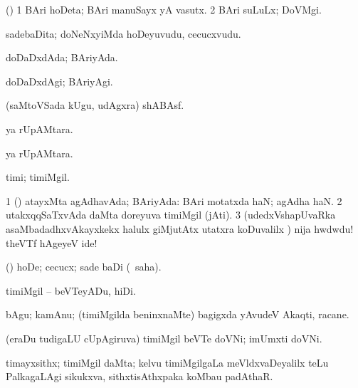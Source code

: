 {{{{{{\bentry
{} 
\gl{\nA}
\expl{}
\bmng
(\ashi) 
\bnum
\num{1} BAri hoDeta; BAri manuSayx yA vasutx. 
\num{2} BAri suLuLx; DoVMgi. 
\enum
\emng
\eentry

\bentry
{} 
\gl{\nA}
\expl{}
\bmng
sadebaDita; doNeNxyiMda hoDeyuvudu, cecucxvudu. 
\emng
\eentry

\bentry
{} 
\gl{\gu}
\expl{}
\bmng
doDaDxdAda; BAriyAda. 
\emng
\eentry

\bentry
{} 
\gl{\kirxvi}
\expl{}
\bmng
doDaDxdAgi; BAriyAgi. 
\emng
\eentry

\bentry
{} 
\gl{\BAavayx}
\expl{}
\bmng
(saMtoVSada kUgu, udAgxra) shABAsf. 
\emng
\eentry

\bentry
{} 
\gl{\gu}
\expl{}
\bmng
{} ya rUpAMtara. 
\emng
\eentry

\bentry
{} 
\gl{\nA}
\expl{}
\bmng
{} ya rUpAMtara. 
\emng
\eentry

\bentry
{} 
\gl{\nA}
\bmng
timi; timiMgil. 
\emng

\noindent 
\gl{\pagu}
\expl{}
\bmng
\bnum
\num{1}  (\AmA) atayxMta agAdhavAda; BAriyAda:  BAri motatxda haN; agAdha haN. 
\num{2}  utakxqqSaTxvAda daMta doreyuva timiMgil (jAti). 
\num{3}  (udedxVshapUvaRka asaMbadadhxvAkayxkekx halulx giMjutAtx utatxra koDuvalilx \parx) nija hwdwdu! theVTf hAgeyeV ide! 
\enum
\emng
\eentry

\bentry
{} 
\gl{\sakirx}
\expl{}
\bmng
(\AmA) hoDe; cecucx; sade baDi (\akirx\ saha). 
\emng

\noindent 
\gl{\akirx}
\expl{}
\bmng
timiMgil -- beVTeyADu, hiDi. 
\emng
\eentry

\bentry
{} 
\gl{\nA}
\expl{}
\bmng
bAgu; kamAnu; (timiMgilda beninxnaMte) bagigxda yAvudeV Akaqti, racane. 
\emng
\eentry

\bentry
{} 
\gl{\nA}
\expl{}
\bmng
(eraDu tudigaLU cUpAgiruva) timiMgil beVTe doVNi; imUmxti doVNi. 
\emng
\eentry

\bentry
{} 
\gl{\nA}
\expl{}
\bmng
timayxsithx; timiMgil daMta; kelvu timiMgilgaLa meVldxvaDeyalilx teLu PalkagaLAgi sikukxva, sithxtisAthxpaka koMbau padAthaR. 
\emng
\eentry

}}}}}}
